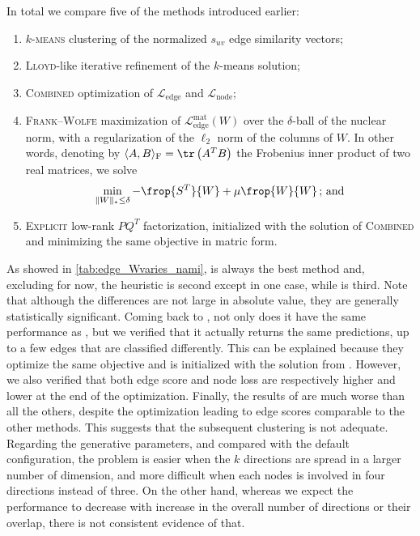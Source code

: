 In total we compare five of the methods introduced earlier:
\begin{enumerate}[1.]
  \item \textsc{$k$-means} clustering of the normalized $s_{uv}$ edge similarity vectors;
  \item \textsc{Lloyd}-like iterative refinement of the $k$-means solution;
  \item \textsc{Combined} optimization of $\mathcal{L}_{\mathrm{edge}}$ and
    $\mathcal{L}_{\mathrm{node}}$;
  \item \textsc{Frank--Wolfe} maximization of $\mathcal{L}_{\mathrm{edge}}^{\mathrm{mat}}(W)$ over
    the $\delta$-ball of the nuclear norm, with a regularization of the $\ell_2$ norm of the columns
    of $W$. In other words, denoting by $\langle A, B \rangle_\mathrm{F} = \tr\left(A^T B\right)$
    the Frobenius inner product of two real matrices, we solve
    \begin{equation*}
      \min_{\|W\|_* \leq \delta} -\frop{S^T}{W} + \mu \frop{W}{W}\,\text{; and}
    \end{equation*}
  \item \textsc{Explicit} low-rank $PQ^T$ factorization, initialized with the solution of
    \textsc{Combined} and minimizing the same objective in matric form.
\end{enumerate}

As showed in \autoref{tab:edge_Wvaries_nami}, \combined{} is always the best method and, excluding
\pqt{} for now, the \lloyd{} heuristic is second except in one case, while \kmeans{} is third. Note
that although the differences are not large in absolute value, they are generally statistically
significant. Coming back to \pqt{}, not only does it have the same performance as \combined{}, but
we verified that it actually returns the same predictions, up to a few edges that are classified
differently. This can be explained because they optimize the same objective and \pqt{} is
initialized with the solution from \combined{}. However, we also verified that both edge score and
node loss are respectively higher and lower at the end of the optimization. Finally, the results of
\fwa{} are much worse than all the others, despite the optimization leading to edge scores
comparable to the other methods. This suggests that the subsequent clustering is not
adequate. Regarding the generative parameters, and compared with the default configuration, the
problem is easier when the $k$ directions are spread in a larger number of dimension, and more
difficult when each nodes is involved in four directions instead of three. On the other hand,
whereas we expect the performance to decrease with increase in the overall number of directions or
their overlap, there is not consistent evidence of that.


